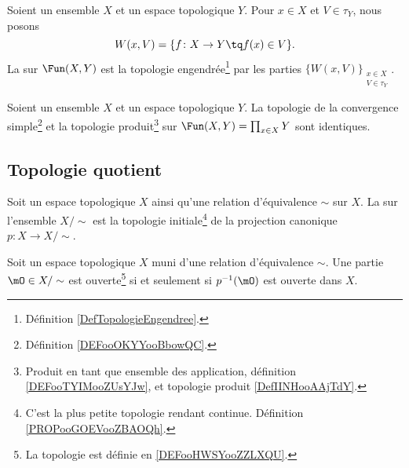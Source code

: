 \begin{definition}	\label{DEFooOKYYooBbowQC}
	Soient un ensemble \( X\) et un espace topologique \( Y\). Pour \( x\in X\) et \( V\in\tau_Y\), nous posons
	\begin{equation}
		W(x,V)=\{f \colon X\to Y\tq f(x)\in V   \}.
	\end{equation}
	La  sur \( \Fun(X,Y)\) est la topologie engendrée\footnote{Définition \ref{DefTopologieEngendree}.} par les parties \( \{ W(x,V) \}_{\substack{ x\in X \\ V\in\tau_Y }  }\).
\end{definition}

\begin{proposition}	\label{PROPooWLWYooBWCajp}
	Soient un ensemble \( X\) et un espace topologique \( Y\). La topologie de la convergence simple\footnote{Définition \ref{DEFooOKYYooBbowQC}.} et la topologie produit\footnote{Produit en tant que ensemble des application, définition \ref{DEFooTYIMooZUsYJw}, et topologie produit \ref{DefIINHooAAjTdY}.} sur \( \Fun(X,Y)=\prod_{x\in X}Y\) sont identiques.
\end{proposition}

\subsection{Topologie quotient}

\begin{definition}        \label{DEFooHWSYooZZLXQU}
	Soit un espace topologique \( X\) ainsi qu'une relation d'équivalence \( \sim\) sur \( X\). La  sur l'ensemble \( X/\sim\) est la topologie initiale\footnote{C'est la plus petite topologie rendant continue. Définition \ref{PROPooGOEVooZBAOQh}.} de la projection canonique \(p \colon X\to X/\sim  \).
\end{definition}

\begin{proposition}     \label{PROPooDRPLooONCwYs}
	Soit un espace topologique \( X\) muni d'une relation d'équivalence \( \sim\). Une partie \( \mO\in X/\sim\) est ouverte\footnote{La topologie est définie en \ref{DEFooHWSYooZZLXQU}.} si et seulement si \( p^{-1}(\mO)\) est ouverte dans \( X\).
\end{proposition}


